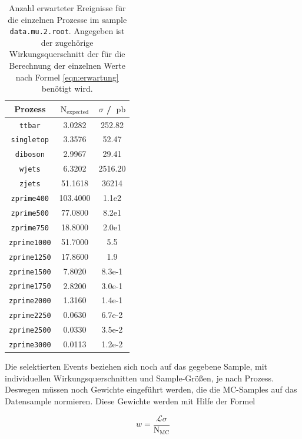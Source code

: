 \begin{table}[H]
    \centering
    \caption{Anzahl erwarteter Ereignisse für die einzelnen Prozesse im sample \texttt{data.mu.2.root}. Angegeben
    ist der zugehörige Wirkungsquerschnitt der für die Berechnung der einzelnen Werte nach Formel
    \eqref{eqn:erwartung} benötigt wird.}
    \label{tab:Erwartungen}
    \begin{tabular}{c|cc}
    \toprule
    Prozess & $\text{N}_\text{expected}$ & $\sigma$ / $\SI{}{\pico\barn}$ \\
    \midrule
    \texttt{ttbar}      &  3.0282   & 252.82    \\
    \texttt{singletop}  &  3.3576   & 52.47     \\
    \texttt{diboson}    &  2.9967   & 29.41     \\
    \texttt{wjets}      &  6.3202   & 2516.20   \\
    \texttt{zjets}      &  51.1618  & 36214     \\
    \texttt{zprime400}  &  103.4000 & 1.1e2     \\
    \texttt{zprime500}  &  77.0800  & 8.2e1     \\
    \texttt{zprime750}  &  18.8000  & 2.0e1     \\
    \texttt{zprime1000} &  51.7000  & 5.5       \\
    \texttt{zprime1250} &  17.8600  & 1.9       \\
    \texttt{zprime1500} &  7.8020   & 8.3e-1    \\
    \texttt{zprime1750} &  2.8200   & 3.0e-1    \\
    \texttt{zprime2000} &  1.3160   & 1.4e-1    \\
    \texttt{zprime2250} &  0.0630   & 6.7e-2    \\
    \texttt{zprime2500} &  0.0330   & 3.5e-2    \\
    \texttt{zprime3000} &  0.0113   & 1.2e-2    \\
    \bottomrule
    \end{tabular}
\end{table}

Die selektierten Events beziehen sich noch auf das gegebene Sample, mit individuellen
Wirkungsquerschnitten und Sample-Größen, je nach Prozess. Deswegen müssen noch
Gewichte eingeführt werden, die die MC-Samples auf das Datensample normieren. Diese
Gewichte werden mit Hilfe der Formel

\begin{equation}
w = \frac{\mathcal{L} \sigma}{\text{N}_\text{MC}}
\label{eqn:gewichte}
\end{equation}

